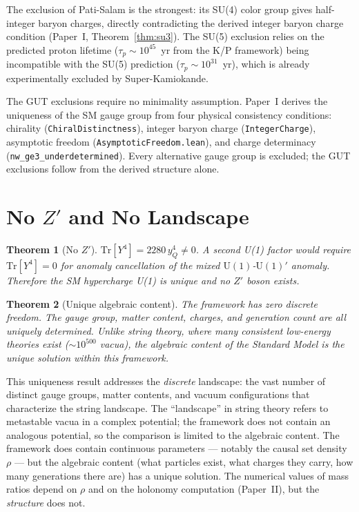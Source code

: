 \documentclass[11pt,letterpaper]{article}
\newtheorem{theorem}{Theorem}
\begin{document}
\noindent The exclusion of Pati-Salam is the strongest: its SU(4) color
group gives half-integer baryon charges, directly contradicting the
derived integer baryon charge condition (Paper~I,
Theorem~\ref{thm:su3}).  The SU(5) exclusion relies on the predicted
proton lifetime ($\tau_p \sim 10^{45}$~yr from the K/P framework)
being incompatible with the SU(5) prediction ($\tau_p \sim
10^{31}$~yr), which is already experimentally excluded by
Super-Kamiokande.

The GUT exclusions require no minimality assumption.  Paper~I derives
the uniqueness of the SM gauge group from four physical consistency
conditions: chirality (\texttt{ChiralDistinctness}), integer baryon
charge (\texttt{IntegerCharge}), asymptotic freedom
(\texttt{AsymptoticFreedom.lean}), and charge determinacy
(\texttt{nw\_ge3\_underdetermined}).  Every alternative gauge group
is excluded; the GUT exclusions follow from the derived structure
alone.

\section{No $Z'$ and No Landscape}

\begin{theorem}[No $Z'$]
\label{thm:nozprime}
$\mathrm{Tr}[Y^4] = 2280\,y_Q^4 \neq 0$. A second U(1) factor
would require $\mathrm{Tr}[Y^4] = 0$ for anomaly cancellation of
the mixed $\mathrm{U}(1)$-$\mathrm{U}(1)'$ anomaly. Therefore the
SM hypercharge U(1) is unique and no $Z'$ boson exists.
\end{theorem}

\begin{theorem}[Unique algebraic content]
\label{thm:nolandscape}
The framework has zero discrete freedom. The gauge group, matter
content, charges, and generation count are all uniquely determined.
Unlike string theory, where many consistent low-energy theories
exist ($\sim 10^{500}$ vacua), the algebraic content of the
Standard Model is the unique solution within this framework.
\end{theorem}

\noindent This uniqueness result addresses the \emph{discrete}
landscape: the vast number of distinct gauge groups,
matter contents, and vacuum configurations that characterize the string
landscape.  The ``landscape'' in string theory refers to metastable
vacua in a complex potential; the framework does not contain an
analogous potential, so the comparison is limited to the algebraic
content.  The framework does contain continuous parameters --- notably
the causal set density $\rho$ --- but the algebraic content (what
particles exist, what charges they carry, how many generations there
are) has a unique solution. The numerical values of mass ratios depend
on $\rho$ and on the holonomy computation (Paper~II), but the
\emph{structure} does not.
\end{document}
